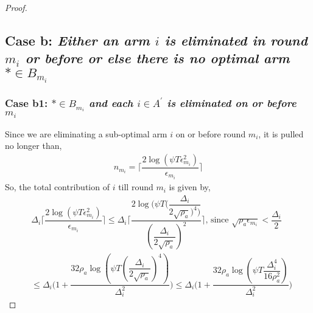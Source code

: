 \begin{proof}

% 



\subsection*{Case b: \textit{Either an arm ${i}$ is eliminated in round $m_{i}$ or before or else there is no optimal arm ${*}\in B_{m_{i}}$ }}

\subsubsection*{Case b1: \textit{${*}\in B_{m_{i}}$ and each ${i}\in A^{'}$ is  eliminated on or before $m_{i}$ } }

 Since we are eliminating a sub-optimal arm ${i}$ on or before round $m_{i}$, it is pulled no longer than, 
 \begin{align*}
 n_{m_{i}}=\bigg\lceil\dfrac{2\log{(\psi T\epsilon_{m_{i}}^{2})}}{\epsilon_{m_{i}}}\bigg\rceil
 \end{align*}
So, the total contribution of ${i}$  till round $m_{i}$ is given by, 
\begin{align*}
&\Delta_{i}\bigg\lceil\dfrac{2\log{(\psi T\epsilon_{m_{i}}^{2})}}{\epsilon_{m_{i}}}\bigg\rceil
\leq\Delta_{i}\bigg\lceil\dfrac{2\log{(\psi T(\dfrac{\Delta_{i}}{2\sqrt{\rho_{a}})^{4})}}}{(\dfrac{\Delta_{i}}{2\sqrt{\rho_{a}}})^{2}}\bigg\rceil \text{, since } \sqrt{\rho_{a}\epsilon_{m_{i}}} < \dfrac{\Delta_{i}}{2}\\
&\leq\Delta_{i}\bigg(1+\dfrac{32\rho_{a}\log{(\psi T(\dfrac{\Delta_{i}}{2\sqrt{\rho_{a}}})^{4})}}{\Delta_{i}^{2}}\bigg)
\leq\Delta_{i}\bigg(1+\dfrac{32\rho_{a}\log{(\psi T\dfrac{\Delta_{i}^{4}}{16\rho_{a}^{2}})}}{\Delta_{i}^{2}}\bigg)
\end{align*} 
 

\end{proof}
